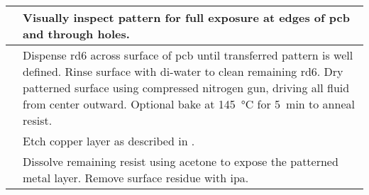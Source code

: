 \documentclass[../main.tex]{subfiles}%
\begin{document}
\begin{table}[p]
\begin{tabu}{ c p{5.50in} }
            &%
            Visually inspect pattern for full exposure at edges of \gls{pcb} and through holes.%
            \\%
            \midrule%
            &%
            Dispense \gls{rd6} across surface of \gls{pcb} until transferred pattern is well defined.
            Rinse surface with \gls{di-water} to clean remaining \gls{rd6}.
            Dry patterned surface using compressed nitrogen gun, driving all fluid from center outward.
            Optional bake at \SI{145}{\celsius} for \SI{5}{\minute} to anneal resist.%
            \\%
            \midrule%
            &%
            Etch copper layer as described in .%
            \\%
            \midrule%
            &%
            Dissolve remaining resist using \gls{acetone} to expose the patterned metal layer.
            Remove surface residue with \gls{ipa}.%
            \\%
            \bottomrule%
        \end{tabu}%
    \end{table}%
\end{document}
